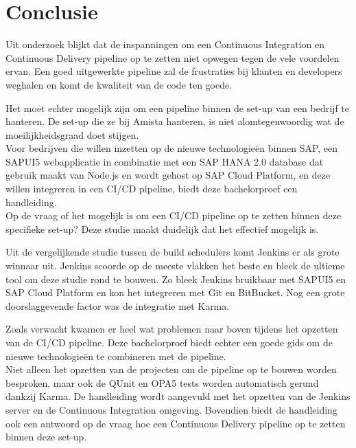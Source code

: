 
\chapter{Conclusie}
\label{ch:conclusie}



Uit onderzoek blijkt dat de inspanningen om een Continuous Integration en Continuous Delivery pipeline op te zetten niet opwegen tegen de vele voordelen ervan. Een goed uitgewerkte pipeline zal de frustraties bij klanten en developers weghalen en komt de kwaliteit van de code ten goede.

Het moet echter mogelijk zijn om een pipeline binnen de set-up van een bedrijf te hanteren. De set-up die ze bij Amista hanteren, is niet alomtegenwoordig wat de moeilijkheidsgraad doet stijgen. \\
Voor bedrijven die willen inzetten op de nieuwe technologieën binnen SAP, een SAPUI5 webapplicatie in combinatie met een SAP HANA 2.0 database dat gebruik maakt van Node.js en wordt gehost op SAP Cloud Platform, en deze willen integreren in een CI/CD pipeline, biedt deze bachelorproef een handleiding.\\

Op de vraag of het mogelijk is om een CI/CD pipeline op te zetten binnen deze specifieke set-up? Deze studie maakt duidelijk dat het effectief mogelijk is.

Uit de vergelijkende studie tussen de build schedulers komt Jenkins er als grote winnaar uit. Jenkins scoorde op de meeste vlakken het beste en bleek de ultieme tool om deze studie rond te bouwen. Zo bleek Jenkins bruikbaar met SAPUI5 en SAP Cloud Platform en kon het integreren met Git en BitBucket. Nog een grote doorslaggevende factor was de integratie met Karma.

Zoals verwacht kwamen er heel wat problemen naar boven tijdens het opzetten van de CI/CD pipeline. Deze bachelorproef biedt echter een goede gids om de nieuwe technologieën te combineren met de pipeline.\\
Niet alleen het opzetten van de projecten om de pipeline op te bouwen worden besproken, maar ook de QUnit en OPA5 tests worden automatisch gerund dankzij Karma. De handleiding wordt aangevuld met het opzetten van de Jenkins server en de Continuous Integration omgeving. Bovendien biedt de handleiding ook een antwoord op de vraag hoe een Continuous Delivery pipeline op te zetten binnen deze set-up.

